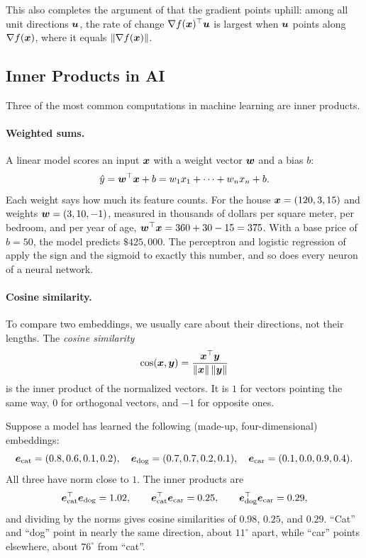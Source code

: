 This also completes the argument of  that the gradient
points uphill: among all unit directions $\bm{u}$, the rate of change
$\nabla f(\bm{x})^\top \bm{u}$ is largest when $\bm{u}$ points along
$\nabla f(\bm{x})$, where it equals $\|\nabla f(\bm{x})\|$.

\subsection{Inner Products in AI}
\label{sec:ch03-inner-ai}

Three of the most common computations in machine learning are inner
products.

\paragraph{Weighted sums.}
A linear model scores an input $\bm{x}$ with a weight vector $\bm{w}$
and a bias $b$:
\[
  \hat{y} = \bm{w}^\top \bm{x} + b = w_1 x_1 + \dots + w_n x_n + b .
\]
Each weight says how much its feature counts. For the house
$\bm{x} = (120, 3, 15)$ and weights $\bm{w} = (3, 10, -1)$, measured in
thousands of dollars per square meter, per bedroom, and per year of age,
$\bm{w}^\top \bm{x} = 360 + 30 - 15 = 375$. With a base price of
$b = 50$, the model predicts $\$425{,}000$. The perceptron and logistic
regression of  apply the sign and the sigmoid to exactly
this number, and so does every neuron of a neural network.

\paragraph{Cosine similarity.}
To compare two embeddings, we usually care about their directions, not
their lengths. The \emph{cosine similarity}
\[
  \cos(\bm{x}, \bm{y})
  = \frac{\bm{x}^\top \bm{y}}{\|\bm{x}\| \, \|\bm{y}\|}
\]
is the inner product of the normalized vectors. It is $1$ for vectors
pointing the same way, $0$ for orthogonal vectors, and $-1$ for opposite
ones.

\begin{example}
  \label{ex:ch03-cosine}
  Suppose a model has learned the following (made-up, four-dimensional)
  embeddings:
  \[
    \bm{e}_{\text{cat}} = (0.8, 0.6, 0.1, 0.2), \quad
    \bm{e}_{\text{dog}} = (0.7, 0.7, 0.2, 0.1), \quad
    \bm{e}_{\text{car}} = (0.1, 0.0, 0.9, 0.4).
  \]
  All three have norm close to $1$. The inner products are
  \[
    \bm{e}_{\text{cat}}^\top \bm{e}_{\text{dog}} = 1.02, \qquad
    \bm{e}_{\text{cat}}^\top \bm{e}_{\text{car}} = 0.25, \qquad
    \bm{e}_{\text{dog}}^\top \bm{e}_{\text{car}} = 0.29,
  \]
  and dividing by the norms gives cosine similarities of $0.98$, $0.25$,
  and $0.29$. ``Cat'' and ``dog'' point in nearly the same direction, about
  $11^\circ$ apart, while ``car'' points elsewhere, about $76^\circ$ from
  ``cat''.
\end{example}


